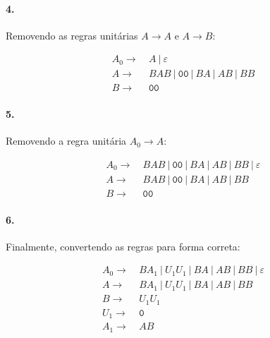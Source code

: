 \documentclass[a4paper, 12pt]{article}
\begin{document}
\paragraph{4.}

Removendo as regras unitárias $A \rightarrow A$ e $A \rightarrow B$:

\begin{align*}
    A_0 \rightarrow & \: A \: | \: \varepsilon \\
    A \rightarrow & \: BAB \: | \: \texttt{00} \: | \: BA \: | \: AB \: | \: BB  \\
    B \rightarrow & \: \texttt{00}
\end{align*}

\paragraph{5.}

Removendo a regra unitária $A_0 \rightarrow A$:

\begin{align*}
    A_0 \rightarrow & \: BAB \: | \: \texttt{00} \: | \: BA \: | \: AB \: | \: BB \: | \: \varepsilon \\
    A \rightarrow & \: BAB \: | \: \texttt{00} \: | \: BA \: | \: AB \: | \: BB  \\
    B \rightarrow & \: \texttt{00}
\end{align*}

\paragraph{6.}

Finalmente, convertendo as regras para forma correta:

\begin{align*}
    A_0 \rightarrow & \: BA_1 \: | \: U_1U_1 \: | \: BA \: | \: AB \: | \: BB \: | \: \varepsilon \\
    A \rightarrow & \: BA_1 \: | \: U_1U_1 \: | \: BA \: | \: AB \: | \: BB  \\
    B \rightarrow & \: U_1U_1 \\
    U_1 \rightarrow & \: \texttt{0} \\
    A_1 \rightarrow & \: AB
\end{align*}
\end{document}
